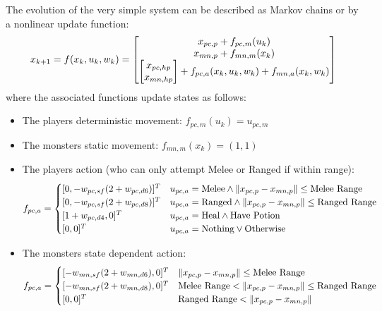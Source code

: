 \documentclass[9pt, onecolumn]{report}
\begin{document}
The evolution of the very simple system can be described as Markov chains or by a nonlinear update function:\[
    x_{k+1} = f(x_k, u_k, w_k) = \mqty[
        x_{pc,p} + f_{pc,m}(u_k)\\
        x_{mn,p} + f_{mn,m}(x_k)\\
        \mqty[x_{pc,hp}\\ x_{mn,hp}] + f_{pc,a}(x_k,u_k,w_k) + f_{mn,a}(x_k,w_k)
    ]
\] where the associated functions update states as follows: 
\begin{itemize}
    \item The players deterministic movement: $f_{pc,m}(u_k) = u_{pc,m}$
    \item The monsters static movement: $f_{mn,m}(x_k) = (1,1)$ 
    \item The players action (who can only attempt Melee or Ranged if within range):\[
        f_{pc,a} = \begin{cases}
            [0, -w_{pc,sf}(2 + w_{pc,d6})]^T & u_{pc,a} = \text{Melee} \land \norm{x_{pc,p} - x_{mn,p}} \leq \text{Melee Range}\\
            [0, -w_{pc,sf}(2 + w_{pc,d8})]^T & u_{pc,a} = \text{Ranged} \land \norm{x_{pc,p} - x_{mn,p}} \leq \text{Ranged Range}\\
            [1 + w_{pc,d4}, 0]^T & u_{pc,a} = \text{Heal} \land \text{Have Potion}\\
            [0, 0]^T & u_{pc,a} = \text{Nothing} \lor \text{Otherwise}
        \end{cases}
    \]
    \item The monsters state dependent action: \[
        f_{pc,a} = \begin{cases}
            [-w_{mn,sf}(2 + w_{mn,d6}), 0]^T & \norm{x_{pc,p} - x_{mn,p}} \leq \text{Melee Range}\\
            [-w_{mn,sf}(2 + w_{mn,d8}), 0]^T & \text{Melee Range} < \norm{x_{pc,p} - x_{mn,p}} \leq \text{Ranged Range}\\
            [0, 0]^T & \text{Ranged Range} < \norm{x_{pc,p} - x_{mn,p}}
        \end{cases}
    \]
\end{itemize}










% 
% 
\end{document}
